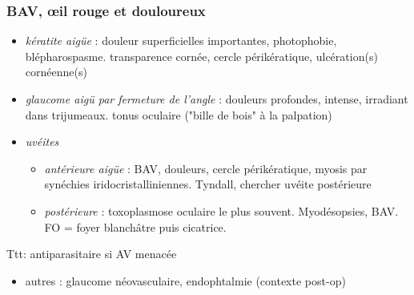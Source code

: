 \documentclass[11pt]{article}
\def\ttt{\hspace*{1cm}Ttt: }
\begin{document}
\subsubsection{BAV, \oe{}il rouge et douloureux}
\label{sec:org4e48ca5}
\begin{itemize}
\item \emph{kératite aigüe} : douleur superficielles importantes, photophobie,
blépharospasme. \dec transparence cornée, cercle périkératique, ulcération(s)
cornéenne(s)
\item \emph{glaucome aigü par fermeture de l'angle} : douleurs profondes, intense,
irradiant dans trijumeaux. \inc\inc tonus oculaire ("bille de bois" à la
palpation)
\item \emph{uvéites}
\begin{itemize}
\item \emph{antérieure aigüe} : BAV, douleurs, cercle périkératique, myosis par synéchies
iridocristalliniennes. Tyndall, chercher uvéite postérieure
\item \emph{postérieure} : toxoplasmose oculaire le plus souvent. Myodésopsies, BAV. FO =
foyer blanchâtre puis cicatrice. \\
\end{itemize}
\end{itemize}
\ttt antiparasitaire si AV menacée
\begin{itemize}
\item autres  : glaucome néovasculaire, endophtalmie (contexte post-op)
\end{itemize}
\end{document}
